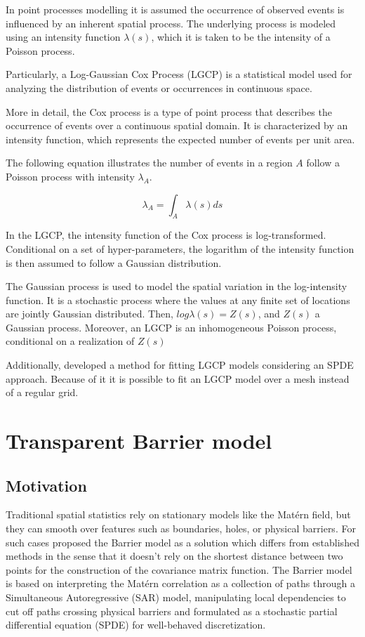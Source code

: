 \documentclass[
]{book}
\begin{document}
In point processes modelling it is assumed the occurrence of observed events is influenced by an inherent spatial process. The underlying process is modeled using an intensity function \(\lambda(s)\), which it is taken to be the intensity of a Poisson process.

Particularly, a Log-Gaussian Cox Process (LGCP) is a statistical model used for analyzing the distribution of events or occurrences in continuous space.

More in detail, the Cox process is a type of point process that describes the occurrence of events over a continuous spatial domain. It is characterized by an intensity function, which represents the expected number of events per unit area.

The following equation illustrates the number of events in a region \(A\) follow a Poisson process with intensity \(\lambda_A\).

\[\lambda_A=\int_A\lambda(s)ds\]

In the LGCP, the intensity function of the Cox process is log-transformed. Conditional on a set of hyper-parameters, the logarithm of the intensity function is then assumed to follow a Gaussian distribution.

The Gaussian process is used to model the spatial variation in the log-intensity function. It is a stochastic process where the values at any finite set of locations are jointly Gaussian distributed. Then, \(log\lambda(s) = Z(s)\), and \(Z(s)\) a Gaussian process. Moreover, an LGCP is an inhomogeneous Poisson process, conditional on a realization of \(Z(s)\)

Additionally, \citet{simpson_going_2016} developed a method for fitting LGCP models considering an SPDE approach. Because of it it is possible to fit an LGCP model over a mesh instead of a regular grid.

\hypertarget{transparent-barrier-model}{%
\chapter{Transparent Barrier model}\label{transparent-barrier-model}}

\hypertarget{motivation}{%
\section{Motivation}\label{motivation}}

Traditional spatial statistics rely on stationary models like the Matérn field, but they can smooth over features such as boundaries, holes, or physical barriers. For such cases \citet{bakka_non-stationary_2019} proposed the Barrier model as a solution which differs from established methods in the sense that it doesn't rely on the shortest distance between two points for the construction of the covariance matrix function. The Barrier model is based on interpreting the Matérn correlation as a collection of paths through a Simultaneous Autoregressive (SAR) model, manipulating local dependencies to cut off paths crossing physical barriers and formulated as a stochastic partial differential equation (SPDE) for well-behaved discretization.
\end{document}
